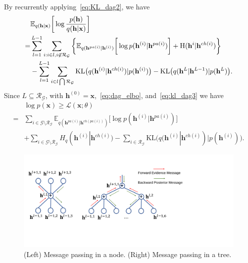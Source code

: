 \documentclass{article} %
\begin{document}
By recurrently applying~\eqref{eq:KL_dag2}, we have 
\begin{align} \label{eq:kl_dag3}
& \mathbb{E}_{q(\mathbf{h} | \mathbf{x})} \bigg[ \log  \frac{p( \mathbf{h})}{q(\mathbf{h}|\mathbf{x})}  \bigg] \\ \notag
=& \sum_{l=1}^{L-1}   \sum_{i:i\in l, i \not\in   \mathcal{R}_{ \mathcal{G}}  }  \bigg\{ \mathbb{E}_{q(\mathbf{h}^{pa(i)}|\mathbf{h}^{(i)})} \bigg[ \log p( \mathbf{h}^{(i)}|  \mathbf{h}^{pa(i)})   \bigg]  +    \text{H}(\mathbf{h}^i | \mathbf{h}^{ch(i)} )  \bigg\} \\ \notag
& -   \sum_{l=1}^{L-1}  \sum_{i \in l \bigcap \mathcal{R}_{ \mathcal{G} }  }  \text{KL}\big(q(\mathbf{h}^{(i)} | \mathbf{h}^{ch(i)} )   | p(\mathbf{h}^{(i)})  \big)   -   \text{KL}\big(q(\mathbf{h}^L | \mathbf{h}^{L-1} )   | p(\mathbf{h}^L)  \big) .
 \end{align}
Since $L  \subseteq   \mathcal{R}_{ \mathcal{G}} $,  with $\mathbf{h}^{(0)} = \mathbf{x}$,~\eqref{eq:dag_elbo}, and~\eqref{eq:kl_dag3} we have 
\begin{align*}  
 &\log p(\mathbf{x}) \geqslant  \mathcal{L}(\mathbf{x}; \theta) \\
=&   \sum_{i \in \mathcal{G}  \setminus  \mathcal{R}_{ \mathcal{G} }  }  \mathbb{E}_{q(\mathbf{h}^{pa(i)}|\mathbf{h}^{ch(pa(i))})} \bigg[ \log p( \mathbf{h}^{(i)}|  \mathbf{h}^{pa(i)})   \bigg]  \\
 & +  \sum_{i \in \mathcal{G}  \setminus  \mathcal{R}_{ \mathcal{G} }  } H_q(\mathbf{h}^{(i)} | \mathbf{h}^{ch(i)} )   -    \sum_{i \in  \mathcal{R}_{ \mathcal{G} }  }  \text{KL}\big(q(\mathbf{h}^{(i)} | \mathbf{h}^{ch(i)} )   | p(\mathbf{h}^{(i)})  \big) .   
 \end{align*}

\begin{figure}[!htbp]%
\begin{center}
 \includegraphics[width=0.7\linewidth]{fig/message_pass.pdf}
\end{center}
  \caption{(Left) Message passing in a node. (Right) Message passing in a tree.} 
\label{fig:message}
\end{figure}
\end{document}

